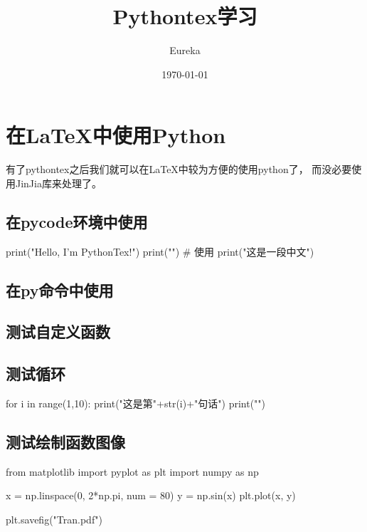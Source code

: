 \documentclass[fontset=windows, 12pt]{article}
\title{Pythontex学习}
\author{Eureka}
\date{\today}
\begin{document}
\maketitle
  \section{在LaTeX中使用Python}
  有了pythontex之后我们就可以在LaTeX中较为方便的使用python了，
  而没必要使用JinJia库来处理了。


  \subsection{在pycode环境中使用}

  \begin{pycode} 
print("Hello, I'm PythonTex!")
print("\n")
# 使用
print("这是一段中文")
  \end{pycode}

  \subsection{在py命令中使用}

  \subsection{测试自定义函数}

  \newpage
  \subsection{测试循环}
  \begin{pycode}
for i in range(1,10):
  print("这是第"+str(i)+"句话")
  print("\n")
  \end{pycode}


  \subsection{测试绘制函数图像}
    \begin{pycode}
from matplotlib import pyplot as plt
import numpy as np

x = np.linspace(0, 2*np.pi, num = 80)
y = np.sin(x)
plt.plot(x, y)

plt.savefig("Tran.pdf")
    \end{pycode} 
\end{document}
